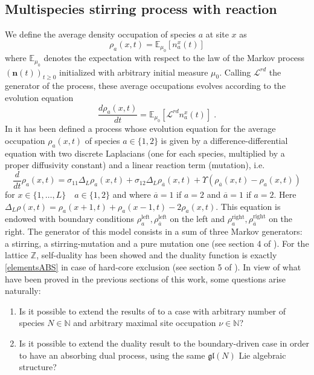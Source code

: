 \documentclass[10pt]{article}
\numberwithin{equation}{section}
\numberwithin{equation}{subsection}
\newcommand{\dt}{\;.}
\begin{document}
\subsection{Multispecies stirring process with reaction} \label{Subsection-RD}
We define the average density occupation of species $a$ at site $x$ as
\begin{equation}
	\rho_{a}(x,t)=\mathbb{E}_{\mu_{0}}\left[n_{a}^{x}(t)\right]
\end{equation}
where $\mathbb{E}_{\mu_{0}}$ denotes the expectation with respect to the law of the Markov process $(\bm{n}(t))_{t\geq 0}$ initialized with arbitrary initial measure $\mu_{0}$. Calling
$\mathcal{L}^{rd}$ the generator of the process, these average occupations evolves according to the evolution equation
\begin{equation}\label{EE-density}
	\frac{d \rho_{a}(x,t)}{dt}=\mathbb{E}_{\mu_{0}}\left[\mathcal{L}^{rd}n_{a}^{x}(t)\right]\dt
\end{equation} 
In \cite{casini2022uphill} it has been defined a process whose evolution equation for the average occupation $\rho_{a}(x,t)$ of species $a\in \{1,2\}$ is given by a difference-differential equation with two discrete Laplacians (one for each species, multiplied by a proper diffusivity constant) and a linear reaction term (mutation), i.e.
\begin{equation}\label{2SpeciesRD}
	\frac{d}{dt} \rho_{a}(x,t)=\sigma_{11}\Delta_{L}\rho_{a}(x,t)+\sigma_{12}\Delta_{L}\rho_{\overline{a}}(x,t)+\Upsilon\left(\rho_{\overline{a}}(x,t)-\rho_{a}(x,t)\right)
\end{equation} 
for $ x\in\{1,\ldots,L\}\quad a\in\{1,2\}$  and where $\overline{a}=1$ if $a=2$ and $\overline{a}=1$ if $a=2$. Here $\Delta_{L}\rho(x,t)=\rho_{a}(x+1,t)+\rho_{a}(x-1,t)-2\rho_{a}(x,t)$.
This equation is endowed with boundary conditions $\rho_{a}^{\text{left}},\rho_{\overline{a}}^{\text{left}}$ on the left and $\rho_{a}^{\text{right}},\rho_{\overline{a}}^{\text{right}}$ on the right. 
The generator of this model consists in a sum of three Markov generators: a stirring, a stirring-mutation and a pure mutation one (see section 4 of \cite{casini2022uphill}). For the lattice $\mathbb{Z}$, self-duality has been showed and the duality function is exactly \eqref{elementsABS} in case of hard-core exclusion (see section 5 of \cite{casini2022uphill}). In view of what have been proved in the previous sections of this work, some questions arise naturally:
\begin{enumerate}
		\item Is it possible to extend the results of \cite{casini2022uphill} to a case with arbitrary number of species $N\in \mathbb{N}$ and arbitrary maximal site occupation $\nu\in \mathbb{N}$?
			\item Is it possible to extend the duality result to the boundary-driven case in order to have an absorbing dual process, using the same $\mathfrak{gl}(N)$ Lie algebraic structure?
\end{enumerate}
\end{document}
